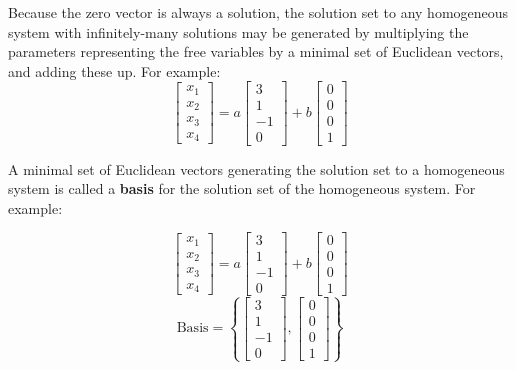 \begin{applicationActivities}{3}{5}
\begin{fact}
  Because the zero vector is always a solution,
  the solution set to any homogeneous system with infinitely-many solutions
  may be generated by multiplying the parameters representing the free variables
  by a minimal set of Euclidean vectors, and adding these up. For example:
  \[
    \begin{bmatrix}
      x_1 \\
      x_2 \\
      x_3 \\
      x_4
    \end{bmatrix}=
    a\begin{bmatrix}
      3 \\
      1 \\
      -1 \\
      0
    \end{bmatrix}+
    b\begin{bmatrix}
      0 \\
      0 \\
      0 \\
      1
    \end{bmatrix}
  \]
\end{fact}

\begin{definition}
  A minimal set of Euclidean vectors generating the solution set to a
  homogeneous system is called a \textbf{basis} for the solution
  set of the homogeneous system. For example:
  \begin{multicols}{2}\noindent
  \[
    \begin{bmatrix}
      x_1 \\
      x_2 \\
      x_3 \\
      x_4
    \end{bmatrix}=
    a\begin{bmatrix}
      3 \\
      1 \\
      -1 \\
      0
    \end{bmatrix}+
    b\begin{bmatrix}
      0 \\
      0 \\
      0 \\
      1
    \end{bmatrix}
  \]
  \[
    \textrm{Basis}=\left\{
    \begin{bmatrix}
      3 \\
      1 \\
      -1 \\
      0
    \end{bmatrix},
    \begin{bmatrix}
      0 \\
      0 \\
      0 \\
      1
    \end{bmatrix}\right\}
  \]
  \end{multicols}
\end{definition}


\end{applicationActivities}
